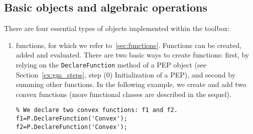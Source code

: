 \documentclass[11pt,a4paper]{article}
\begin{document}
\subsection{Basic objects and algebraic operations}\label{sec:basicobjects}
There are four essential types of objects implemented within the toolbox:
\begin{enumerate}
\item functions, for which we refer to~\ref{sec:functions}. Functions can be created, added and evaluated. There are two basic ways to create functions: first, by relying on the \verb?DeclareFunction? method of a PEP object (see Section~\ref{ex:gm_steps}, step (0) Initialization of a PEP), and second by summing other functions. In the following example, we create and add two convex functions (more functional classes are described in the sequel).\\[-1cm]
\begin{lstlisting}
% We declare two convex functions: f1 and f2.
f1=P.DeclareFunction('Convex'); 
f2=P.DeclareFunction('Convex');


\end{lstlisting}
\end{enumerate}
\end{document}
